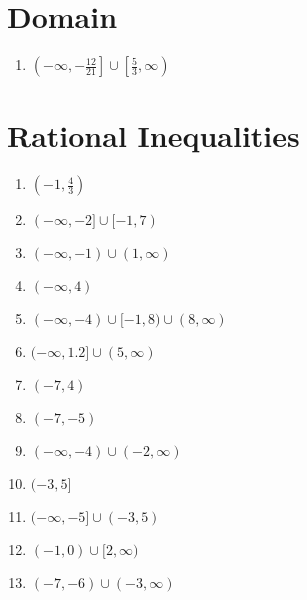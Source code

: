 \section*{Domain}
\begin{enumerate}
	\item $\left(-\infty, -\frac{12}{21}\right] \cup \left[\frac{5}{3}, \infty\right)$
\end{enumerate}

\section*{Rational Inequalities}
\begin{multicols}{2}
\begin{enumerate}
    \item $\left(-1, \frac{4}{3}\right)$
    \item $(-\infty,-2] \cup [-1, 7)$
    \item $(-\infty, -1) \cup (1, \infty)$
    \item $(-\infty, 4)$
    \item $(-\infty, -4) \cup [-1, 8) \cup (8, \infty)$
    \item $(-\infty, 1.2] \cup (5, \infty)$
    \item $(-7, 4)$
    \item $(-7, -5)$
    \item $(-\infty, -4) \cup (-2, \infty)$
    \item $(-3, 5]$
    \item $(-\infty, -5] \cup (-3, 5)$
    \item $(-1, 0) \cup [2, \infty)$
    \item $(-7, -6) \cup (-3, \infty)$
\end{enumerate}
\end{multicols}